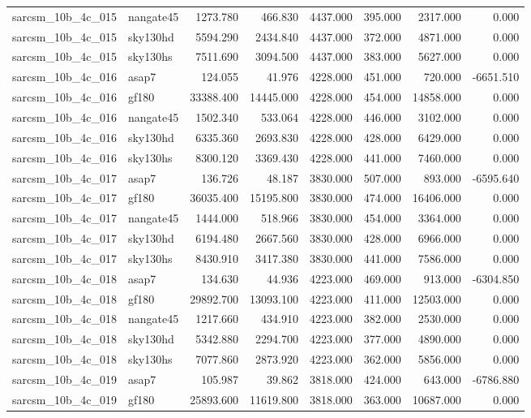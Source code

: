 \begin{tabular}{llrrrrrr}
sarcsm\_10b\_4c\_015 & nangate45 & 1273.780 & 466.830 & 4437.000 & 395.000 & 2317.000 & 0.000 \\
sarcsm\_10b\_4c\_015 & sky130hd & 5594.290 & 2434.840 & 4437.000 & 372.000 & 4871.000 & 0.000 \\
sarcsm\_10b\_4c\_015 & sky130hs & 7511.690 & 3094.500 & 4437.000 & 383.000 & 5627.000 & 0.000 \\
sarcsm\_10b\_4c\_016 & asap7 & 124.055 & 41.976 & 4228.000 & 451.000 & 720.000 & -6651.510 \\
sarcsm\_10b\_4c\_016 & gf180 & 33388.400 & 14445.000 & 4228.000 & 454.000 & 14858.000 & 0.000 \\
sarcsm\_10b\_4c\_016 & nangate45 & 1502.340 & 533.064 & 4228.000 & 446.000 & 3102.000 & 0.000 \\
sarcsm\_10b\_4c\_016 & sky130hd & 6335.360 & 2693.830 & 4228.000 & 428.000 & 6429.000 & 0.000 \\
sarcsm\_10b\_4c\_016 & sky130hs & 8300.120 & 3369.430 & 4228.000 & 441.000 & 7460.000 & 0.000 \\
sarcsm\_10b\_4c\_017 & asap7 & 136.726 & 48.187 & 3830.000 & 507.000 & 893.000 & -6595.640 \\
sarcsm\_10b\_4c\_017 & gf180 & 36035.400 & 15195.800 & 3830.000 & 474.000 & 16406.000 & 0.000 \\
sarcsm\_10b\_4c\_017 & nangate45 & 1444.000 & 518.966 & 3830.000 & 454.000 & 3364.000 & 0.000 \\
sarcsm\_10b\_4c\_017 & sky130hd & 6194.480 & 2667.560 & 3830.000 & 428.000 & 6966.000 & 0.000 \\
sarcsm\_10b\_4c\_017 & sky130hs & 8430.910 & 3417.380 & 3830.000 & 441.000 & 7586.000 & 0.000 \\
sarcsm\_10b\_4c\_018 & asap7 & 134.630 & 44.936 & 4223.000 & 469.000 & 913.000 & -6304.850 \\
sarcsm\_10b\_4c\_018 & gf180 & 29892.700 & 13093.100 & 4223.000 & 411.000 & 12503.000 & 0.000 \\
sarcsm\_10b\_4c\_018 & nangate45 & 1217.660 & 434.910 & 4223.000 & 382.000 & 2530.000 & 0.000 \\
sarcsm\_10b\_4c\_018 & sky130hd & 5342.880 & 2294.700 & 4223.000 & 377.000 & 4890.000 & 0.000 \\
sarcsm\_10b\_4c\_018 & sky130hs & 7077.860 & 2873.920 & 4223.000 & 362.000 & 5856.000 & 0.000 \\
sarcsm\_10b\_4c\_019 & asap7 & 105.987 & 39.862 & 3818.000 & 424.000 & 643.000 & -6786.880 \\
sarcsm\_10b\_4c\_019 & gf180 & 25893.600 & 11619.800 & 3818.000 & 363.000 & 10687.000 & 0.000 \\

\end{tabular}
